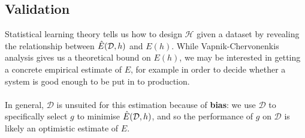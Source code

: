 \subsection{Validation}
\label{validation}
Statistical learning theory tells us how to design $\mathcal{H}$ given a dataset by revealing the relationship between $\hat{E}(\mathcal{D}, h)$ and $E(h)$. While Vapnik-Chervonenkis analysis gives us a theoretical bound on $E(h)$, we may be interested in getting a concrete empirical estimate of $E$, for example in order to decide whether a system is good enough to be put in to production.
\\\\
In general, $\mathcal{D}$ is unsuited for this estimation because of \textbf{bias}: we use $\mathcal{D}$ to specifically select $g$ to minimise $\hat{E}(\mathcal{D}, h)$, and so the performance of $g$ on $\mathcal{D}$ is likely an optimistic estimate of $E$.

